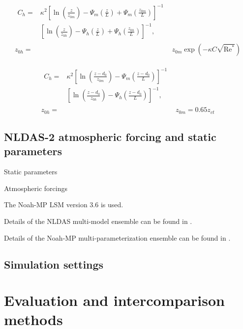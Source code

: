 \documentclass[essd]{copernicus}
\begin{document}
\begin{align}
    \begin{split}
        C_h = & \kappa^2 \left[ \ln\left(\frac{z}{z_{0m}}\right)
        - \Psi_{m}\left(\frac{z}{L}\right)
         + \Psi_{m}\left(\frac{z_{0m}}{L}\right) \right]^{-1} \\
        & \left[ \ln\left(\frac{z}{z_{0h}}\right)
        - \Psi_{h}\left(\frac{z}{L}\right)
        + \Psi_{h}\left(\frac{z_{0h}}{L}\right) \right]^{-1} \text{,}
    \end{split}                                      \\
    z_{0h} = & z_{0m} \exp\left(-\kappa C \sqrt{\text{Re}^*}\right)
\end{align}

\begin{align}
    \begin{split}
        C_h = & \kappa^2 \left[ \ln\left(\frac{z-d_0}{z_{0m}}\right)
        - \Psi_{m}\left(\frac{z-d_0}{L}\right) \right]^{-1} \\
        & \left[ \ln\left(\frac{z-d_0}{z_{0h}}\right)
        - \Psi_{h}\left(\frac{z-d_0}{L}\right) \right]^{-1}
        \text{,}
    \end{split}      \\
    z_{0h} = & z_{0m} = 0.65 z_{ct}
\end{align}

\subsection{NLDAS-2 atmospheric forcing and static parameters} \label{sec:data:nldas}

Static parameters

Atmospheric forcings

The Noah-MP LSM version 3.6 is used.

Details of the NLDAS multi-model ensemble can be found in
\citet{xia2012JGRA,xia2012JGRAa,fei2021WRR}.

Details of the Noah-MP multi-parameterization ensemble can be found in
\citet{zheng2019WRR,zheng2020JAMES,fei2021WRR}.


\subsection{Simulation settings} \label{sec:data:simulation}


\section{Evaluation and intercomparison methods} \label{sec:evaluation}
\end{document}
